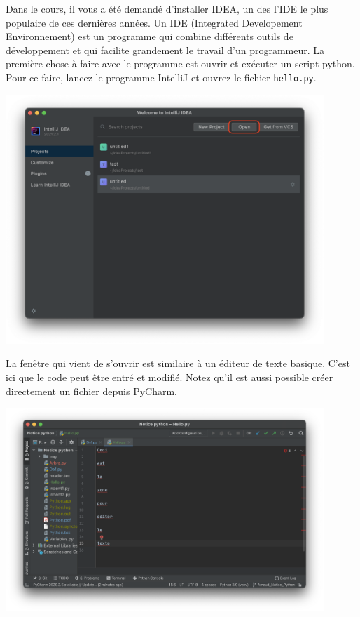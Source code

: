 Dans le cours, il vous a été demandé d'installer IDEA, un des l'IDE le plus populaire de ces dernières années. Un IDE (Integrated Developement Environnement) est un programme qui combine différents outils de développement et qui facilite grandement le travail d'un programmeur. La première chose à faire avec le programme est ouvrir et exécuter un script python. Pour ce faire, lancez le programme IntelliJ et ouvrez le fichier \lstinline{hello.py}.
\begin{center}
	\includegraphics[width=12cm]{IntelliJ.png}	
\end{center}

La fenêtre qui vient de s'ouvrir est similaire à un éditeur de texte basique. C'est ici que le code peut être entré et modifié. Notez qu'il est aussi possible créer directement un fichier depuis PyCharm.
\begin{center}
	\includegraphics[width=12cm]{zone.png}	
\end{center}


